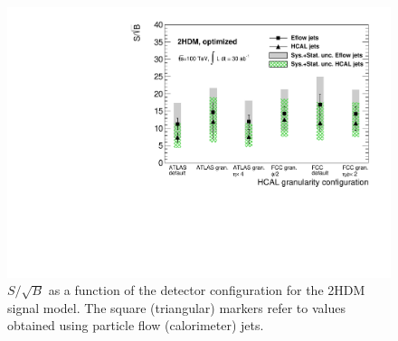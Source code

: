 \begin{figure}[h]
	\centering
	\includegraphics[width=\linewidth]{./images/SSBvsGran_2HDM_Opt.pdf}
	\caption{$S/\sqrt{B}$ as a function of the detector configuration for the 2HDM signal model. The square (triangular) markers refer to values obtained using particle flow (calorimeter) jets.}
	\label{fig:SSB_gran_2HDM}
\end{figure}

